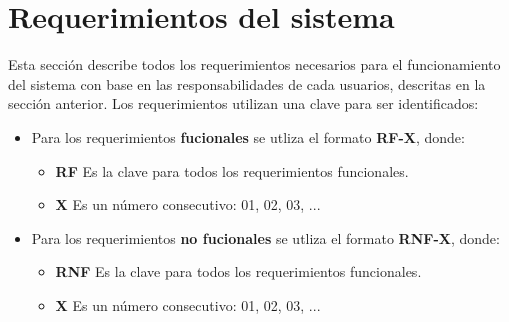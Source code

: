 \section{Requerimientos del sistema}
Esta sección describe todos los requerimientos necesarios para el funcionamiento del sistema con base en las responsabilidades de cada
usuarios, descritas en la sección anterior.
Los requerimientos utilizan una clave para ser identificados:

\begin{itemize}
	\item Para los requerimientos \textbf{fucionales} se utliza el formato \textbf{RF-X}, donde:
    \begin{itemize}
        \item \textbf{RF} Es la clave para todos los requerimientos funcionales.
        \item \textbf{X} Es un número consecutivo: 01, 02, 03, ...
    \end{itemize}

    \item Para los requerimientos \textbf{no fucionales} se utliza el formato \textbf{RNF-X}, donde:
    \begin{itemize}
        \item \textbf{RNF} Es la clave para todos los requerimientos funcionales.
        \item \textbf{X} Es un número consecutivo: 01, 02, 03, ...
    \end{itemize}

\end{itemize}

